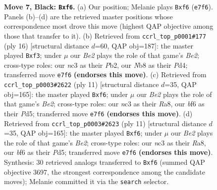 \documentclass[11pt]{article}
\begin{document}
\begin{figure}[p]
\caption{\textbf{Move 7, Black: \texttt{Bxf6}.} (a) Our position; Melanie plays \texttt{Bxf6} (\texttt{e7f6}). Panels (b)--(d) are the retrieved master positions whose correspondence most drove this move (highest QAP objective among those that transfer to it). (b) Retrieved from \texttt{ccrl\_top\_p0001\#177} (ply 16) [structural distance $d$=60, QAP obj=187]: the master played \texttt{Bxf3}; under $\mu$ our \emph{Be2} plays the role of that game's \emph{Be2}; cross-type roles: our \emph{n}c3 as their \emph{P}b2, our \emph{N}b8 as their \emph{P}d4; transferred move \texttt{e7f6} \textbf{(endorses this move)}. (c) Retrieved from \texttt{ccrl\_top\_p0003\#2622} (ply 11) [structural distance $d$=35, QAP obj=165]: the master played \texttt{Bxf6}; under $\mu$ our \emph{Be2} plays the role of that game's \emph{Be2}; cross-type roles: our \emph{n}c3 as their \emph{R}a8, our \emph{b}f6 as their \emph{P}d5; transferred move \texttt{e7f6} \textbf{(endorses this move)}. (d) Retrieved from \texttt{ccrl\_top\_p0003\#2623} (ply 11) [structural distance $d$=35, QAP obj=165]: the master played \texttt{Bxf6}; under $\mu$ our \emph{Be2} plays the role of that game's \emph{Be2}; cross-type roles: our \emph{n}c3 as their \emph{R}a8, our \emph{b}f6 as their \emph{P}d5; transferred move \texttt{e7f6} \textbf{(endorses this move)}. Synthesis: 30 retrieved analogs transferred to \texttt{Bxf6} (summed QAP objective 3697, the strongest correspondence among the candidate moves); Melanie committed it via the \texttt{search} selector.}
\label{fig:thought-m13}
\end{figure}

\clearpage
\end{document}
